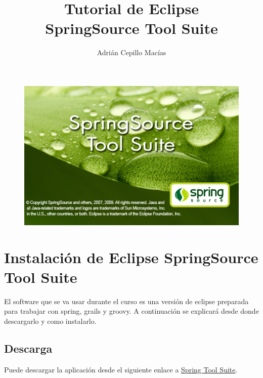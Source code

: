 \documentclass[a4paper,12pt,spanish]{article}
\author{Adrián Cepillo Macías}
\title{Tutorial de Eclipse \\SpringSource Tool Suite}
\begin{document}
\begin{titlepage}
  \maketitle
  \begin{figure}[h!]
    \centering
    \includegraphics[scale=0.75]{sts}
    \label{fig:Portada}
  \end{figure}
\end{titlepage}
 
\tableofcontents
\newpage 

\section{Instalación de Eclipse SpringSource Tool Suite}

El software que se va usar durante el curso es una versión de eclipse preparada para trabajar con spring, grails y groovy. A continuación se explicará desde donde descargarlo y como instalarlo.

\subsection{Descarga}

Puede descargar la aplicación desde el siguiente enlace a \href{http://www.springsource.com/products/springsource-google-download?utm\_source=eclipse.org\&utm\_medium=web\&utm\_content=promotedDL\&utm\_campaign=STS}{Spring Tool Suite}.
\end{document}
